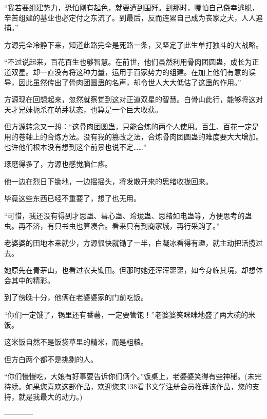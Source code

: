 \begin{this_body}
“我若要组建势力，恐怕刚有起色，就要遭到围歼。到那时，哪怕自己侥幸逃脱，辛苦组建的基业也必定付之东流了。到最后，反而连累自己成为丧家之犬，人人追捕。”

方源完全冷静下来，知道此路完全是死路一条，又坚定了此生单打独斗的大战略。

“不过说起来，百花百生也够智慧。在前世，他们虽然利用骨肉团圆蛊，成长为正道双星。却一直没有将这种力量，运用于百家势力的组建。在加上他们有意的误导，因此虽然传出了骨肉团圆蛊的名声，却令世人大大低估了这蛊的作用。”

方源现在回想起来，忽然就察觉到这对正道双星的智慧。白骨山此行，能够将这对天才兄妹扼杀在萌芽状态，也算是一个巨大收获。

但方源转念又一想：“这骨肉团圆蛊，只能合炼的两个人使用。百生、百花一定是用的卷轴上的合炼方法。没有我的篡改之法，合炼骨肉团圆蛊的难度要大大增加。也许他们根本没有想到这个前景也说不定……”

琢磨得多了，方源也感觉脑仁疼。

他一边在烈日下锄地，一边摇摇头，将发散开来的思绪收拢回来。

毕竟这些东西已经不重要了，想了也无用。

“可惜，我还没有得到才思蛊、彗心蛊、玲珑蛊、思绪如电蛊等，方便思考的蛊虫。再不济，有只书虫也算凑合。看来只有到商家城，再行采购了。”

老婆婆的田地本来就少，方源很快就锄了一半，白凝冰看得有趣，就主动把活揽过去。

她原先在青茅山，也看过农夫锄田。但那时她还浑浑噩噩，如今身临其境，却想体会其中的精彩。

到了傍晚十分，他俩在老婆婆家的门前吃饭。

“你们一定饿了，锅里还有番薯，一定要管饱！”老婆婆笑眯眯地盛了两大碗的米饭。

这米饭自然不是饭袋草里的精米，而是粗粮。

但方白两个都不是挑剔的人。

“你们慢慢吃，大娘有好事要告诉你们俩个。”饭桌上，老婆婆笑得有些神秘。(未完待续。如果您喜欢这部作品，欢迎您来138看书文学注册会员推荐该作品，您的支持，就是我最大的动力。)

------------

\end{this_body}

